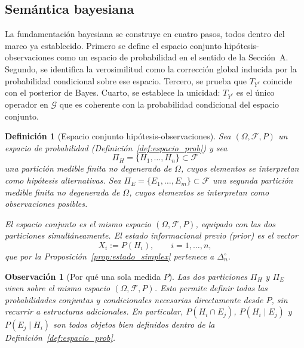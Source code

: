 ﻿\documentclass[12pt]{article}
\newtheorem{definicion}{Definición}[section]
\newtheorem{observacion}{Observación}[section]
\begin{document}
\subsection{Semántica bayesiana}

La fundamentación bayesiana se construye en cuatro pasos, todos dentro del marco ya establecido. Primero se define el espacio conjunto hipótesis-observaciones como un espacio de probabilidad en el sentido de la Sección~A. Segundo, se identifica la verosimilitud como la corrección global inducida por la probabilidad condicional sobre ese espacio. Tercero, se prueba que $T_{Y^\ell}$ coincide con el posterior de Bayes. Cuarto, se establece la unicidad: $T_{Y^\ell}$ es el único operador en $\mathcal{G}$ que es coherente con la probabilidad condicional del espacio conjunto.

\begin{definicion}[Espacio conjunto hipótesis-observaciones]\label{def:espacio_conjunto}
Sea $(\Omega,\mathcal{F},P)$ un espacio de probabilidad (Definición~\ref{def:espacio_prob}) y sea
\[
\Pi_H = \{H_1,\dots,H_n\} \subset \mathcal{F}
\]
una partición medible finita no degenerada de $\Omega$, cuyos elementos se interpretan como \emph{hipótesis alternativas}. Sea $\Pi_E = \{E_1,\dots,E_m\} \subset \mathcal{F}$ una segunda partición medible finita no degenerada de $\Omega$, cuyos elementos se interpretan como \emph{observaciones posibles}.

El \emph{espacio conjunto} es el mismo espacio $(\Omega,\mathcal{F},P)$, equipado con las dos particiones simultáneamente. El estado informacional previo (\emph{prior}) es el vector
\[
X_i := P(H_i), \qquad i=1,\dots,n,
\]
que por la Proposición~\ref{prop:estado_simplex} pertenece a $\Delta_n^\circ$.
\end{definicion}

\begin{observacion}[Por qué una sola medida $P$]\label{obs:una_medida}
Las dos particiones $\Pi_H$ y $\Pi_E$ viven sobre el mismo espacio $(\Omega,\mathcal{F},P)$. Esto permite definir todas las probabilidades conjuntas y condicionales necesarias directamente desde $P$, sin recurrir a estructuras adicionales. En particular, $P(H_i \cap E_j)$, $P(H_i \mid E_j)$ y $P(E_j \mid H_i)$ son todos objetos bien definidos dentro de la Definición~\ref{def:espacio_prob}.
\end{observacion}
\end{document}

